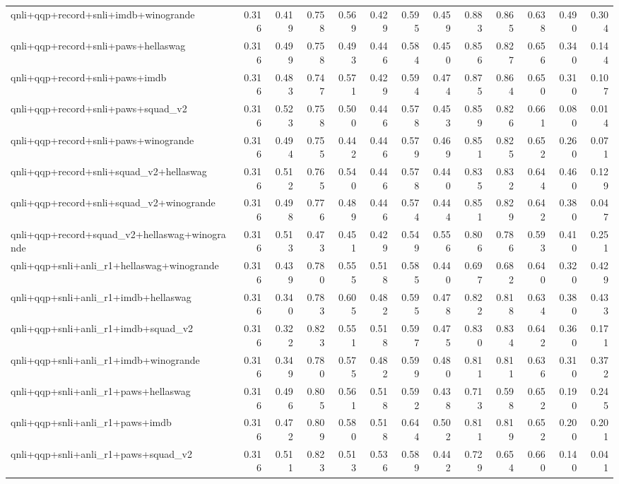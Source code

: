 \begin{table}[t]
\begin{tabular}{lrrrrrrrrrrrr}
    qnli+qqp+record+snli+imdb+winogrande & 0.316 & 0.419 & 0.758 & 0.569 & 0.429 & 0.595 & 0.459 & 0.883 & 0.865 & 0.638 & 0.490 & 0.304 \\
    qnli+qqp+record+snli+paws+hellaswag & 0.316 & 0.499 & 0.758 & 0.493 & 0.446 & 0.584 & 0.450 & 0.856 & 0.827 & 0.656 & 0.340 & 0.144 \\
    qnli+qqp+record+snli+paws+imdb & 0.316 & 0.483 & 0.747 & 0.571 & 0.429 & 0.594 & 0.474 & 0.875 & 0.864 & 0.650 & 0.310 & 0.107 \\
    qnli+qqp+record+snli+paws+squad\_v2 & 0.316 & 0.523 & 0.758 & 0.500 & 0.446 & 0.578 & 0.453 & 0.859 & 0.826 & 0.661 & 0.080 & 0.014 \\
    qnli+qqp+record+snli+paws+winogrande & 0.316 & 0.494 & 0.755 & 0.442 & 0.446 & 0.579 & 0.469 & 0.851 & 0.825 & 0.652 & 0.260 & 0.071 \\
    qnli+qqp+record+snli+squad\_v2+hellaswag & 0.316 & 0.512 & 0.765 & 0.540 & 0.446 & 0.578 & 0.440 & 0.835 & 0.832 & 0.644 & 0.460 & 0.129 \\
    qnli+qqp+record+snli+squad\_v2+winogrande & 0.316 & 0.498 & 0.776 & 0.489 & 0.446 & 0.574 & 0.444 & 0.851 & 0.829 & 0.642 & 0.380 & 0.047 \\
    qnli+qqp+record+squad\_v2+hellaswag+winogrande & 0.316 & 0.513 & 0.473 & 0.451 & 0.429 & 0.549 & 0.556 & 0.806 & 0.786 & 0.593 & 0.410 & 0.251 \\
    qnli+qqp+snli+anli\_r1+hellaswag+winogrande & 0.316 & 0.439 & 0.780 & 0.555 & 0.518 & 0.585 & 0.440 & 0.697 & 0.682 & 0.640 & 0.320 & 0.429 \\
    qnli+qqp+snli+anli\_r1+imdb+hellaswag & 0.316 & 0.340 & 0.783 & 0.605 & 0.482 & 0.595 & 0.478 & 0.822 & 0.818 & 0.634 & 0.380 & 0.433 \\
    qnli+qqp+snli+anli\_r1+imdb+squad\_v2 & 0.316 & 0.322 & 0.823 & 0.551 & 0.518 & 0.597 & 0.475 & 0.830 & 0.834 & 0.642 & 0.360 & 0.171 \\
    qnli+qqp+snli+anli\_r1+imdb+winogrande & 0.316 & 0.349 & 0.780 & 0.575 & 0.482 & 0.599 & 0.480 & 0.811 & 0.811 & 0.636 & 0.310 & 0.372 \\
    qnli+qqp+snli+anli\_r1+paws+hellaswag & 0.316 & 0.496 & 0.805 & 0.561 & 0.518 & 0.592 & 0.438 & 0.713 & 0.598 & 0.652 & 0.190 & 0.245 \\
    qnli+qqp+snli+anli\_r1+paws+imdb & 0.316 & 0.472 & 0.809 & 0.580 & 0.518 & 0.644 & 0.502 & 0.811 & 0.819 & 0.652 & 0.200 & 0.201 \\
    qnli+qqp+snli+anli\_r1+paws+squad\_v2 & 0.316 & 0.511 & 0.823 & 0.513 & 0.536 & 0.589 & 0.442 & 0.729 & 0.654 & 0.660 & 0.140 & 0.041 \\

\end{tabular}
\end{table}
